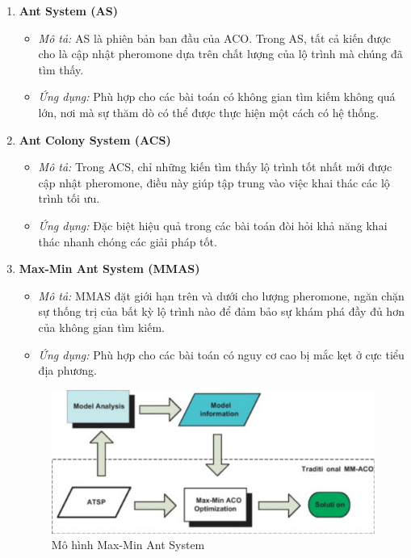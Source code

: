 \documentclass[14pt]{article}
\begin{document}
	\begin{enumerate}
		\item \textbf{Ant System (AS)}
		\begin{itemize}
			\item \textit{Mô tả:} AS là phiên bản ban đầu của ACO. Trong AS, tất cả kiến được cho là cập nhật pheromone dựa trên chất lượng của lộ trình mà chúng đã tìm thấy.
			\item \textit{Ứng dụng:} Phù hợp cho các bài toán có không gian tìm kiếm không quá lớn, nơi mà sự thăm dò có thể được thực hiện một cách có hệ thống.
		\end{itemize}
		
		\item \textbf{Ant Colony System (ACS)}
		\begin{itemize}
			\item \textit{Mô tả:} Trong ACS, chỉ những kiến tìm thấy lộ trình tốt nhất mới được cập nhật pheromone, điều này giúp tập trung vào việc khai thác các lộ trình tối ưu.
			\item \textit{Ứng dụng:} Đặc biệt hiệu quả trong các bài toán đòi hỏi khả năng khai thác nhanh chóng các giải pháp tốt.
		\end{itemize}
		
		\item \textbf{Max-Min Ant System (MMAS)}
		\begin{itemize}
			\item \textit{Mô tả:} MMAS đặt giới hạn trên và dưới cho lượng pheromone, ngăn chặn sự thống trị của bất kỳ lộ trình nào để đảm bảo sự khám phá đầy đủ hơn của không gian tìm kiếm.
			\item \textit{Ứng dụng:} Phù hợp cho các bài toán có nguy cơ cao bị mắc kẹt ở cực tiểu địa phương.
		\end{itemize}
		\begin{figure}[htbp]
			\centering
			\includegraphics[width=\textwidth]{./Image/Mô hình Max-Min Ant System.png}
			\caption{Mô hình Max-Min Ant System}
			\label{fig:mylabel}
		\end{figure}
	

\end{enumerate}
\end{document}
